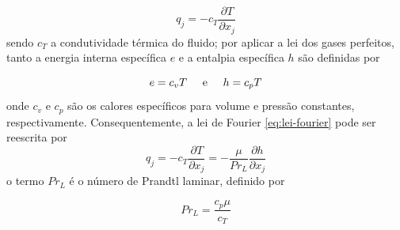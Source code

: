 \begin{equation}
	\label{eq:lei-fourier}
	q_j = -c_{T}\frac{\partial T}{\partial x_j}
\end{equation}
%
sendo \(c_{T}\) a condutividade térmica do fluido; por aplicar a lei dos gases perfeitos, tanto a energia interna específica \(e\) e a entalpia específica \(h\) são definidas por

\begin{equation}
	\label{eq:equacoes-entalpia-energiainterna-calores-especificos}
	e = c_{v}T \hspace{0.5cm} \text{e} \hspace{0.5cm} h = c_{p}T
\end{equation}
%
onde \(c_v\) e \(c_p\) são os calores específicos para volume e pressão constantes, respectivamente. Consequentemente, a lei de Fourier \ref{eq:lei-fourier} pode ser reescrita por
%
\begin{equation}
	\label{eq:lei-fourier-NOVA}
	q_j = -c_T\frac{\partial T}{\partial x_j} = -\frac{\mu}{Pr_L}\frac{\partial h}{\partial x_j}
\end{equation}
%
o termo \(Pr_L\) é o número de Prandtl laminar, definido por

\begin{equation}
	Pr_L = \frac{c_{p}\mu}{c_T}
\end{equation}